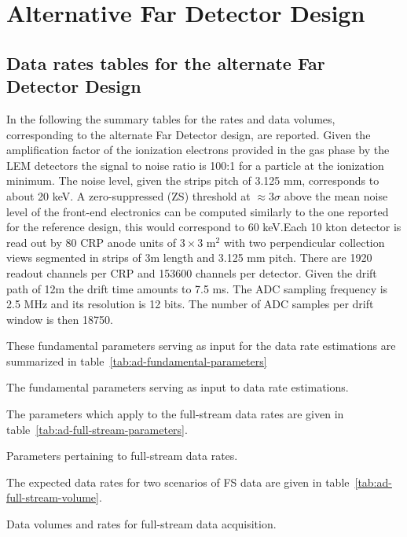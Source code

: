 \chapter{Alternative Far Detector Design}
\label{ch:alt-annex-rate}

\section{Data rates tables for the alternate Far Detector Design}

In the following the summary tables for the rates and data volumes, corresponding to the alternate Far Detector design, are reported.
Given the amplification factor of the ionization electrons provided in the gas phase by the LEM detectors the signal to noise ratio is 100:1
for a particle at the ionization minimum. The noise level, given the strips pitch of 3.125 mm, corresponds to about 20 keV. 
A zero-suppressed (ZS) threshold at $\approx 3\sigma$ above the mean noise level of the front-end electronics can be computed similarly to the 
one reported for the reference design, this would correspond to 60 keV.Each 10 kton detector is read out by
80 CRP anode units of $3 \times 3$ m$^2$ with two perpendicular collection views segmented in strips of 3m length and 3.125 mm pitch. 
There are 1920 readout channels per CRP and 153600 channels per detector. Given the drift path of 12m the drift time amounts to 7.5 ms.  The ADC sampling frequency is 2.5 MHz and its resolution is 12 bits. The number of ADC samples per drift window is then 18750.

These fundamental parameters serving as input for the data rate estimations are summarized in table~\ref{tab:ad-fundamental-parameters}

\begin{table}[htbp]
  \centering
  \caption{The fundamental parameters serving as input to data rate estimations.}
  
  \label{tab:ad-fundamental-parameters}
\end{table}

The parameters which apply to the full-stream data rates are given in table~\ref{tab:ad-full-stream-parameters}.

\begin{table}[htbp]
  \centering
  \caption{Parameters pertaining to full-stream data rates.}
  
  \label{tab:ad-full-stream-parameters}
\end{table}

The expected data rates for two scenarios of FS data are given in table~\ref{tab:ad-full-stream-volume}.

\begin{table}[htbp]
  \centering
  \caption{Data volumes and rates for full-stream data
    acquisition.}
  
  \label{tab:ad-full-stream-volume}
\end{table}